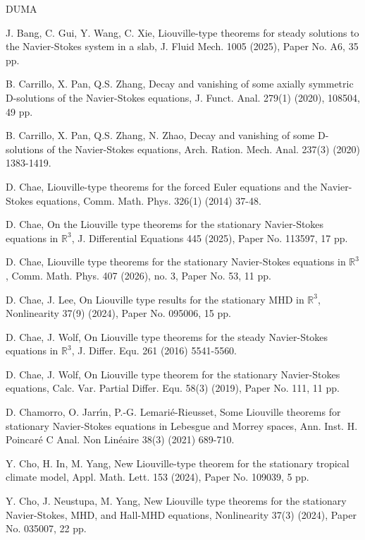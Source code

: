 \documentclass[11pt,reqno]{amsart}
\numberwithin{Thm}{section}
\begin{document}
\begin {thebibliography}{DUMA}

 J. Bang, C. Gui, Y. Wang, C. Xie, Liouville-type theorems for steady solutions to the Navier-Stokes system in a slab, J. Fluid Mech. 1005 (2025), Paper No. A6, 35 pp.

 B. Carrillo, X. Pan, Q.S. Zhang, Decay and vanishing of some axially symmetric D-solutions of the Navier-Stokes equations, J. Funct. Anal. 279(1) (2020), 108504, 49 pp.

 B. Carrillo, X. Pan, Q.S. Zhang, N. Zhao, Decay and vanishing of some D-solutions of the Navier-Stokes equations, Arch. Ration. Mech. Anal. 237(3) (2020) 1383-1419.

 D. Chae, Liouville-type theorems for the forced Euler equations and the Navier-Stokes equations, Comm. Math. Phys. 326(1) (2014) 37-48.

 D. Chae, On the Liouville type theorems for the stationary Navier-Stokes equations in $\mathbb{R}^3$, J. Differential Equations 445 (2025), Paper No. 113597, 17 pp.

 D. Chae, Liouville type theorems for the stationary Navier-Stokes equations in $\mathbb{R}^3$, Comm. Math. Phys. 407 (2026), no. 3, Paper No. 53, 11 pp.

 D. Chae, J. Lee, On Liouville type results for the stationary MHD in $\mathbb{R}^3$, Nonlinearity 37(9) (2024), Paper No. 095006, 15 pp.

 D. Chae, J. Wolf, On Liouville type theorems for the steady Navier-Stokes equations in $\mathbb{R}^{3}$, J. Differ. Equ.  261 (2016) 5541-5560.

 D. Chae, J. Wolf, On Liouville type theorem for the stationary Navier-Stokes equations, Calc. Var. Partial Differ. Equ. 58(3) (2019), Paper No. 111, 11 pp.

 D. Chamorro, O. Jarr\'{\i}n, P.-G. Lemari\'{e}-Rieusset, Some Liouville theorems for stationary Navier-Stokes equations in Lebesgue and Morrey spaces, Ann. Inst. H. Poincar\'{e} C Anal. Non Lin\'{e}aire 38(3) (2021) 689-710.

 Y. Cho, H. In, M. Yang, New Liouville-type theorem for the stationary tropical climate model, Appl. Math. Lett. 153 (2024), Paper No. 109039, 5 pp.

 Y. Cho, J. Neustupa, M. Yang, New Liouville type theorems for the stationary Navier-Stokes, MHD, and Hall-MHD equations, Nonlinearity 37(3) (2024), Paper No. 035007, 22 pp.


\end{thebibliography}
\end{document}
